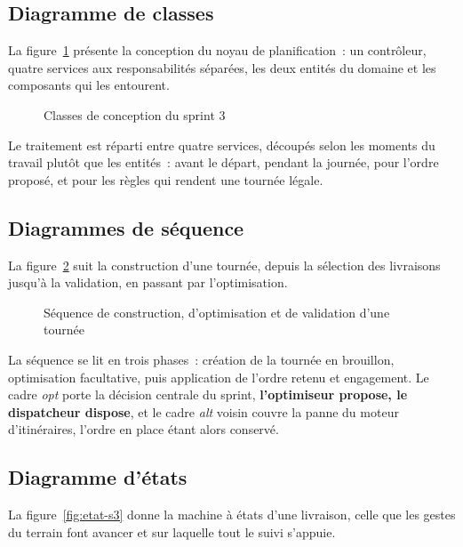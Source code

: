 \subsection{Diagramme de classes}

La figure~\ref{fig:class-s3} présente la conception du noyau de planification~: un contrôleur, quatre
services aux responsabilités séparées, les deux entités du domaine et les composants qui les
entourent.

\begin{figure}[H]
\centering
{}
\caption{Classes de conception du sprint 3}
\label{fig:class-s3}
\end{figure}

Le traitement est réparti entre quatre services, découpés selon les moments du travail plutôt que les
entités~:  avant le départ,  pendant la
journée,  pour l'ordre proposé, et  pour les
règles qui rendent une tournée légale.

\subsection{Diagrammes de séquence}

La figure~\ref{fig:seq-s3} suit la construction d'une tournée, depuis la sélection des livraisons
jusqu'à la validation, en passant par l'optimisation.

\begin{figure}[H]
\centering
{}
\caption{Séquence de construction, d'optimisation et de validation d'une tournée}
\label{fig:seq-s3}
\end{figure}

La séquence se lit en trois phases~: création de la tournée en brouillon, optimisation facultative,
puis application de l'ordre retenu et engagement. Le cadre \emph{opt} porte la décision centrale du
sprint, \textbf{l'optimiseur propose, le dispatcheur dispose}, et le cadre \emph{alt} voisin couvre
la panne du moteur d'itinéraires, l'ordre en place étant alors conservé.

\subsection{Diagramme d'états}

La figure~\ref{fig:etat-s3} donne la machine à états d'une livraison, celle que les gestes du terrain
font avancer et sur laquelle tout le suivi s'appuie.

